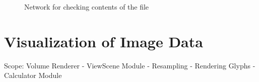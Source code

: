 \documentclass[fleqn,11pt,openany]{book}
\begin{document}
\begin{figure}
\caption{Network for checking contents of the file}\label{fig:ChangingColorMap}
\end{figure}


\chapter{Visualization of Image Data}

\begin{introduction}
Scope: Volume Renderer - ViewScene Module - Resampling - Rendering Glyphs - Calculator Module
\end{introduction}
\end{document}
